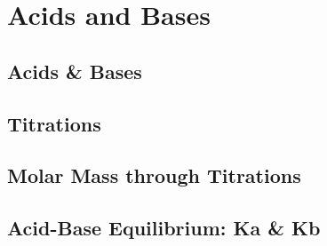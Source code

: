 \documentclass[../hchem.tex]{subfiles}
\begin{document}
\chapter{Acids and Bases}
\section{Acids \& Bases}
\section{Titrations}
\section{Molar Mass through Titrations}
\section{Acid-Base Equilibrium: Ka \& Kb}
\end{document}
